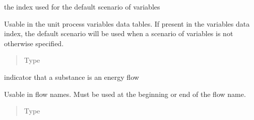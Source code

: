 \documentclass[a4paper,10pt,english]{sphinxmanual}
\begin{document}
\begin{fulllineitems}
\label{\detokenize{dataconfig:dataconfig.default_scenario}}
the index used for the default scenario of variables

Usable in the unit process variables data tables.
If present in the variables data index, the default scenario will be used
when a scenario of variables is not otherwise specified.
\begin{quote}\begin{description}
\item[{Type}] \leavevmode
{}

\end{description}\end{quote}

\end{fulllineitems}


\begin{fulllineitems}
\label{\detokenize{dataconfig:dataconfig.energy_flows}}
indicator that a substance is an energy flow

Usable in flow names. Must be used at the beginning or end of the flow name.
\begin{quote}\begin{description}
\item[{Type}] \leavevmode
{}

\end{description}\end{quote}

\end{fulllineitems}

\end{document}
